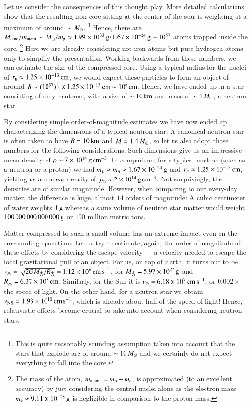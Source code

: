 Let us consider the consequences of this thought play.
More detailed calculations show that the resulting iron-core sitting at the center of the star is weighting at a maximum of around $\sim \, M_{\odot}$.%
\footnote{This is quite reasonably sounding assumption taken into account that the stars that explode are of around $\sim10\, M_{\odot}$ and we certainly do not expect everything to fall into the core.
}
Hence, there are $M_{\mathrm{core}} / m_{\mathrm{atom}} \sim \, M_{\odot} / m_{\mathrm{p}} \approx 1.99 \times 10^{33} \, \mathrm{g} / 1.67 \times 10^{-24} \, \mathrm{g} \sim 10^{57}$ atoms trapped inside the core.
\footnote{
    The mass of the atom, $m_{\mathrm{atom}} = \mproton + \me$, is approximated (to an excellent accuracy) by just considering the central nuclei alone as the electron mass $m_{\mathrm{e}} \approx 9.11 \times 10^{-28} \, \mathrm{g}$ is negligible in comparison to the proton mass.
}
Here we are already considering not iron atoms but pure hydrogen atoms only to simplify the presentation.
Working backwards from these numbers, we can estimate the size of the compressed core.
Using a typical radius for the nuclei of $r_{\mathrm{n}} \approx 1.25 \times 10^{-13}\, \mathrm{cm}$, we would expect these particles to form an object of around $R \sim (10^{57})^{\frac{1}{3}} \times 1.25 \times 10^{-13}\, \mathrm{cm} \sim 10^6 \, \mathrm{cm}$.
Hence, we have ended up in a star consisting of only neutrons, with a size of $\sim 10\, \mathrm{km}$ and mass of $\sim 1\, M_{\odot}$, a neutron star!

By considering simple order-of-magnitude estimates we have now ended up characterizing the dimensions of a typical neutron star.
A canonical neutron star is often taken to have $R=10\, \mathrm{km}$ and $M=1.4\, M_{\odot}$, so let us also adopt those numbers for the following considerations.
Such dimensions give us an impressive mean density of $\rho \sim 7 \times 10^{14} \, \mathrm{g}\,\mathrm{cm}^{-3}$.
In comparison, for a typical nucleon (such as a neutron or a proton) we had $m_{p} \approx m_{n} \approx 1.67 \times 10^{-24} \, \mathrm{g}$ and $r_{n} \approx 1.25 \times 10^{-13} \, \mathrm{cm}$, yielding us a nuclear density of $\, \rho_{\mathrm{n}}  \approx 2 \times 10^{14} \, \mathrm{g}\,\mathrm{cm}^{-3}$.
Not surprisingly, the densities are of similar magnitude.
However, when comparing to our every-day matter, the difference is huge, almost $14$ orders of magnitude:
A cubic centimeter of water weights $1\, \mathrm{g}$ whereas a same volume of neutron star matter would weight $100\,000\,000\,000\,000\, \mathrm{g}$ or $100$ million metric tons.


Matter compressed to such a small volume has an extreme impact even on the surrounding spacetime.
Let us try to estimate, again, the order-of-magnitude of these effects by considering the escape velocity --- a velocity needed to escape the local gravitational pull of an object.
For us, on top of Earth, it turns out to be $v_{\mathrm{\earth}} = \sqrt{2G M_{\earth} / R_{\earth}} = \Ten{1.12}{6} \cms$, for $M_{\earth} = \Ten{5.97}{27} \g$ and $R_{\earth} = \Ten{6.37}{8} \cm$.
Similarly, for the Sun it is $v_{\odot} = 6.18 \times 10^{7} \, \mathrm{cm}\,\mathrm{s}^{-1}$, or $0.002 \times$ the speed of light.
On the other hand, for a neutron star we obtain $v_{\mathrm{NS}} = 1.93 \times 10^{10} \, \mathrm{cm}\,\mathrm{s}^{-1}$, which is already about half of the speed of light!
Hence, relativistic effects become crucial to take into account when considering neutron stars.


